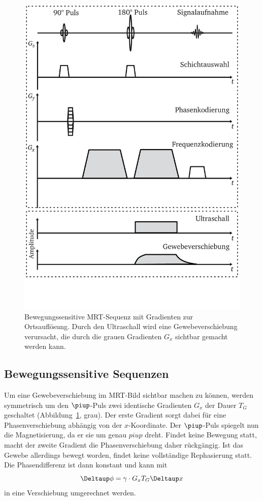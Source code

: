 \documentclass[
    11pt,
    ngerman
]{scrreprt}
\begin{document}
\begin{figure}
    \centering
    \includegraphics[width=.7\textwidth]{Abbildungen/sediffmono.pdf}
    \caption{%
        Bewegungssensitive MRT-Sequenz mit Gradienten zur Ortsauflösung. Durch den Ultraschall wird eine Gewebeverschiebung verursacht, die durch die grauen Gradienten $G_x$ sichtbar gemacht werden kann.
    }
    \label{fig:bew-sens-sequenz}
\end{figure}

\subsection{Bewegungssensitive Sequenzen}

Um eine Gewebeverschiebung im MRT-Bild sichtbar machen zu können, werden symmetrisch um den $\piup$-Puls zwei identische Gradienten $G_x$ der Dauer $T_G$ geschaltet (Abbildung~\ref{fig:bew-sens-sequenz}, grau). Der erste Gradient sorgt dabei für eine Phasenverschiebung abhängig von der $x$-Koordinate. Der $\piup$-Puls spiegelt nun die Magnetisierung, da er sie um genau $piup$ dreht. Findet keine Bewegung statt, macht der zweite Gradient die Phasenverschiebung daher rückgängig. Ist das Gewebe allerdings bewegt worden, findet keine vollständige Rephasierung statt. Die Phasendifferenz ist dann konstant und kann mit
\begin{equation}
    \Deltaup \phi = \gamma \cdot G_x T_G \Deltaup x \label{eq:phi_x}
\end{equation}
in eine Verschiebung umgerechnet werden.
\end{document}
